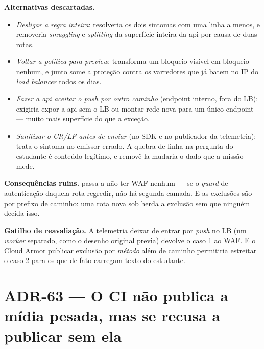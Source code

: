 \textbf{Alternativas descartadas.}
\begin{itemize}
  \item \emph{Desligar a regra  inteira}: resolveria os dois
    sintomas com uma linha a menos, e removeria \emph{smuggling} e
    \emph{splitting} da superfície inteira da api por causa de duas rotas.
  \item \emph{Voltar a política para \emph{preview}}: transforma um bloqueio
    visível em bloqueio nenhum, e junto some a proteção contra os
    varredores que já batem no IP do \emph{load balancer} todos os dias.
  \item \emph{Fazer a api aceitar o \emph{push} por outro caminho} (endpoint
    interno, fora do LB): exigiria expor a api sem o LB ou montar rede nova
    para um único endpoint --- muito mais superfície do que a exceção.
  \item \emph{Sanitizar o CR/LF antes de enviar} (no SDK e no publicador da
    telemetria): trata o sintoma no emissor errado. A quebra de linha na
    pergunta do estudante é conteúdo legítimo, e removê-la mudaria o dado que a
    missão mede.
\end{itemize}

\textbf{Consequências ruins.}  passa a não ter WAF
nenhum --- se o \emph{guard} de autenticação daquela rota regredir, não há
segunda camada. E as exclusões são por prefixo de caminho: uma rota nova sob
 herda a exclusão sem que ninguém decida isso.

\textbf{Gatilho de reavaliação.} A telemetria deixar de entrar por \emph{push}
no LB (um \emph{worker} separado, como o desenho original previa) devolve o
caso 1 ao WAF. E o Cloud Armor publicar exclusão por \emph{método} além de
caminho permitiria estreitar o caso 2 para os  que de fato carregam
texto do estudante.

\section{ADR-63 --- O CI não publica a mídia pesada, mas se recusa a publicar
sem ela}
\label{adr:midia-externa}

